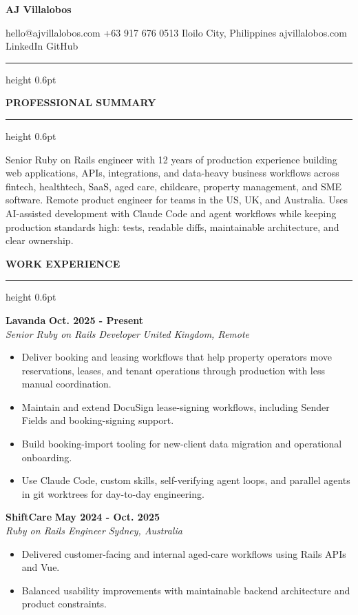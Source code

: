 \documentclass[10pt,letterpaper]{article}
\newcommand{\sectionheading}[1]{%
  \vspace{11pt}
  {\large\bfseries\MakeUppercase{#1}}\par
  \vspace{1pt}
  \hrule height 0.6pt
  \vspace{5pt}
}
\newcommand{\roleentry}[4]{%
  \textbf{#1} \hfill \textbf{#2}\\
  \textit{#3} \hfill \textit{#4}\\[-2pt]
}
\begin{document}
\fontsize{10.25}{11.6}\selectfont

{\fontsize{24}{26}\selectfont\bfseries AJ Villalobos}\par
\vspace{1pt}
hello@ajvillalobos.com
\hspace{0.4em}\textbar{}\hspace{0.4em}
+63 917 676 0513
\hspace{0.4em}\textbar{}\hspace{0.4em}
Iloilo City, Philippines
\hspace{0.4em}\textbar{}\hspace{0.4em}
ajvillalobos.com
\hspace{0.4em}\textbar{}\hspace{0.4em}
LinkedIn
\hspace{0.4em}\textbar{}\hspace{0.4em}
GitHub
\vspace{3pt}
\hrule height 0.6pt

\sectionheading{Professional Summary}
Senior Ruby on Rails engineer with 12 years of production experience building web applications, APIs, integrations, and data-heavy business workflows across fintech, healthtech, SaaS, aged care, childcare, property management, and SME software. Remote product engineer for teams in the US, UK, and Australia. Uses AI-assisted development with Claude Code and agent workflows while keeping production standards high: tests, readable diffs, maintainable architecture, and clear ownership.

\sectionheading{Work Experience}
\roleentry{Lavanda}{Oct. 2025 - Present}{Senior Ruby on Rails Developer}{United Kingdom, Remote}
\begin{itemize}
  \item Deliver booking and leasing workflows that help property operators move reservations, leases, and tenant operations through production with less manual coordination.
  \item Maintain and extend DocuSign lease-signing workflows, including Sender Fields and booking-signing support.
  \item Build booking-import tooling for new-client data migration and operational onboarding.
  \item Use Claude Code, custom skills, self-verifying agent loops, and parallel agents in git worktrees for day-to-day engineering.
\end{itemize}

\roleentry{ShiftCare}{May 2024 - Oct. 2025}{Ruby on Rails Engineer}{Sydney, Australia}
\begin{itemize}
  \item Delivered customer-facing and internal aged-care workflows using Rails APIs and Vue.
  \item Balanced usability improvements with maintainable backend architecture and product constraints.
\end{itemize}
\end{document}
